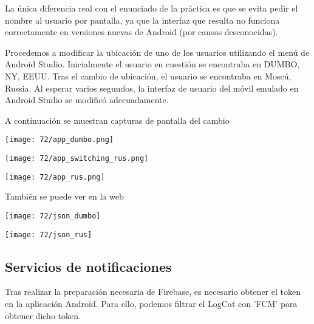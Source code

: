 La única diferencia real con el enunciado de la práctica es que se evita pedir el nombre
al usuario por pantalla, ya que la interfaz que resulta no funciona correctamente en versiones
nuevas de Android (por causas desconocidas).

Procedemos a modificar la ubicación de uno de los usuarios utilizando el menú de Android Studio.
Inicialmente el usuario en cuestión se encontraba en DUMBO, NY, EEUU.
Tras el cambio de ubicación, el usuario se encontraba en Moscú, Russia.
Al esperar varios segundos, la interfaz de usuario del móvil emulado en Android Studio se modificó adecuadamente.

A continuación se muestran capturas de pantalla del cambio

\begin{minipage}{\linewidth}
	\centering
	\texttt{[image: 72/app\_dumbo.png]}
	\label{fig:72/4}
\end{minipage}
\begin{minipage}{\linewidth}
	\centering
	\texttt{[image: 72/app\_switching\_rus.png]}
	\label{fig:72/5}
\end{minipage}
\begin{minipage}{\linewidth}
	\centering
	\texttt{[image: 72/app\_rus.png]}
	\label{fig:72/6}
\end{minipage}

También se puede ver en la web

\begin{minipage}{\linewidth}
	\centering
	\texttt{[image: 72/json\_dumbo]}
	\label{fig:72/7}
\end{minipage}
\begin{minipage}{\linewidth}
	\centering
	\texttt{[image: 72/json\_rus]}
	\label{fig:72/8}
\end{minipage}

\subsection{Servicios de notificaciones}

Tras realizar la preparación necesaria de Firebase, es necesario obtener el token en la aplicación Android.
Para ello, podemos filtrar el LogCat con 'FCM' para obtener dicho token.

